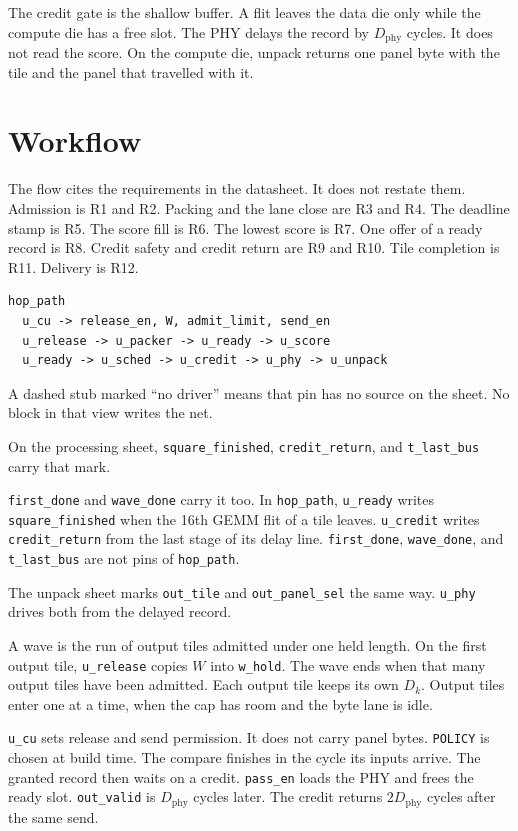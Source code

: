\documentclass[11pt,a4paper]{article}
\begin{document}
The credit gate is the shallow buffer.
A flit leaves the data die only while the compute die has a free slot.
The PHY delays the record by $D_{\mathrm{phy}}$ cycles.
It does not read the score.
On the compute die, unpack returns one panel byte with the tile and the panel that travelled with it.

\section{Workflow}
The flow cites the requirements in the datasheet.
It does not restate them.
Admission is R1 and R2.
Packing and the lane close are R3 and R4.
The deadline stamp is R5.
The score fill is R6.
The lowest score is R7.
One offer of a ready record is R8.
Credit safety and credit return are R9 and R10.
Tile completion is R11.
Delivery is R12.

\begin{verbatim}
hop_path
  u_cu -> release_en, W, admit_limit, send_en
  u_release -> u_packer -> u_ready -> u_score
  u_ready -> u_sched -> u_credit -> u_phy -> u_unpack
\end{verbatim}
\figpath

A dashed stub marked ``no driver'' means that pin has no source on the sheet.
No block in that view writes the net.

On the processing sheet, \texttt{square\_finished}, \texttt{credit\_return}, and \texttt{t\_last\_bus} carry that mark.

\texttt{first\_done} and \texttt{wave\_done} carry it too.
In \texttt{hop\_path}, \texttt{u\_ready} writes \texttt{square\_finished} when the 16th GEMM flit of a tile leaves.
\texttt{u\_credit} writes \texttt{credit\_return} from the last stage of its delay line.
\texttt{first\_done}, \texttt{wave\_done}, and \texttt{t\_last\_bus} are not pins of \texttt{hop\_path}.

The unpack sheet marks \texttt{out\_tile} and \texttt{out\_panel\_sel} the same way.
\texttt{u\_phy} drives both from the delayed record.

A wave is the run of output tiles admitted under one held length.
On the first output tile, \texttt{u\_release} copies $W$ into \texttt{w\_hold}.
The wave ends when that many output tiles have been admitted.
Each output tile keeps its own $D_k$.
Output tiles enter one at a time, when the cap has room and the byte lane is idle.

\texttt{u\_cu} sets release and send permission.
It does not carry panel bytes.
\texttt{POLICY} is chosen at build time.
The compare finishes in the cycle its inputs arrive.
The granted record then waits on a credit.
\texttt{pass\_en} loads the PHY and frees the ready slot.
\texttt{out\_valid} is $D_{\mathrm{phy}}$ cycles later.
The credit returns $2 D_{\mathrm{phy}}$ cycles after the same send.
\end{document}
